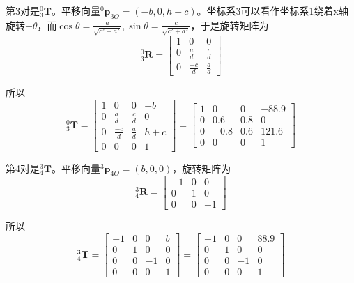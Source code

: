 \documentclass{homework}
\begin{document}
\begin{sol}
  第3对是$ _3^0\mathbf{T} $。平移向量$ ^0\mathbf{p}_{3O} = (-b, 0, h+c) $。坐标系3可以看作坐标系1绕着x轴旋转$ -\theta $，而$ \cos\theta = \frac{a}{\sqrt{c^2+a^2}}, \sin\theta = \frac{c}{\sqrt{c^2+a^2}} $，于是旋转矩阵为
  \[
    _3^0\mathbf{R} = 
    \begin{bmatrix}
      1 & 0 & 0 \\
      0 & \frac{a}{d} & \frac{c}{d} \\
      0 & \frac{-c}{d} & \frac{a}{d} 
    \end{bmatrix}
  \]

  所以
  \[
    _3^0\mathbf{T} = 
    \begin{bmatrix}
      1 & 0 & 0 & -b \\
      0 & \frac{a}{d} & \frac{c}{d} & 0 \\
      0 & \frac{-c}{d} & \frac{a}{d} & h+c \\
      0 & 0 & 0 & 1
    \end{bmatrix} = 
    \begin{bmatrix}
      1 & 0 & 0 & -88.9 \\
      0 & 0.6 & 0.8 & 0 \\
      0 & -0.8 & 0.6 & 121.6 \\
      0 & 0 & 0 & 1
    \end{bmatrix}
  \]

  第4对是$ _4^3\mathbf{T} $。平移向量$ ^3\mathbf{p}_{4O} = (b, 0, 0) $，旋转矩阵为
  \[
    _4^3\mathbf{R} = 
    \begin{bmatrix}
      -1 & 0 & 0 \\
      0 & 1 & 0 \\
      0 & 0 & -1 
    \end{bmatrix}
  \]

  所以
  \[
    _4^3\mathbf{T} = 
    \begin{bmatrix}
      -1 & 0 & 0 & b \\
      0 & 1 & 0 & 0 \\
      0 & 0 & -1 & 0 \\
      0 & 0 & 0 & 1
    \end{bmatrix} =
    \begin{bmatrix}
      -1 & 0 & 0 & 88.9 \\
      0 & 1 & 0 & 0 \\
      0 & 0 & -1 & 0 \\
      0 & 0 & 0 & 1
    \end{bmatrix}
  \]


\end{sol}
\end{document}
